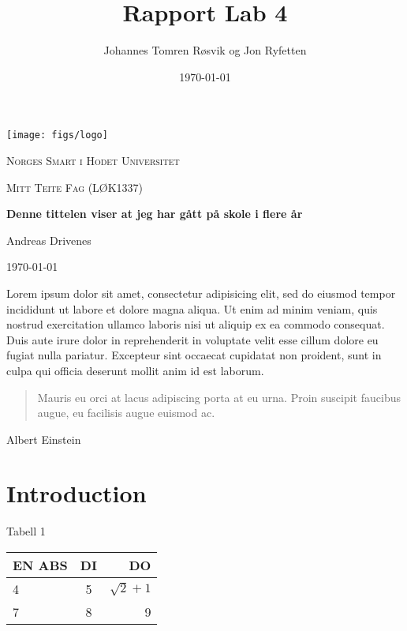 \documentclass{article}
\title{Rapport Lab 4}
\author{Johannes Tomren Røsvik og Jon Ryfetten}
\date{\today}
\begin{document}
\begin{titlepage}
	\centering
	\vspace{2.5cm}
	\texttt{[image: figs/logo]}\par\vspace{1cm}
	{\scshape\LARGE Norges Smart i Hodet Universitet \par}
	\vspace{1cm}
	{\scshape\Large Mitt Teite Fag (LØK1337)\par}
	\vspace{1.5cm}
	{\huge\bfseries Denne tittelen viser at jeg har gått på skole i flere år\par}
	\vspace{2cm}
	{\Large Andreas Drivenes\par}
	\vfill
	{\large \today\par}
\end{titlepage}

\maketitle



\newpage
Lorem ipsum dolor sit amet, consectetur adipisicing elit, sed do eiusmod tempor incididunt ut labore et dolore magna aliqua. Ut enim ad minim veniam, quis nostrud exercitation ullamco laboris nisi ut aliquip ex ea commodo consequat. Duis aute irure dolor in reprehenderit in voluptate velit esse cillum dolore eu fugiat nulla pariatur. Excepteur sint occaecat cupidatat non proident, sunt in culpa qui officia deserunt mollit anim id est laborum.

\begin{quote}
	Mauris eu orci at lacus adipiscing porta at eu urna. Proin suscipit faucibus augue, eu facilisis augue euismod ac.
\end{quote}
\begin{center}
	Albert Einstein
\end{center}

\section{Introduction}

\begin{center}
	Tabell 1
\end{center}
\begin{center} %
	\begin{tabular} {| l | c | r |} \hline
			EN ABS 	& DI 	& DO \\ \hline
			4 			& 5 	& $\sqrt{2} + 1$ \\ \hline
			7 			& 8 	& 9 \\ \hline
	\end{tabular}
\end{center}
\end{document}
